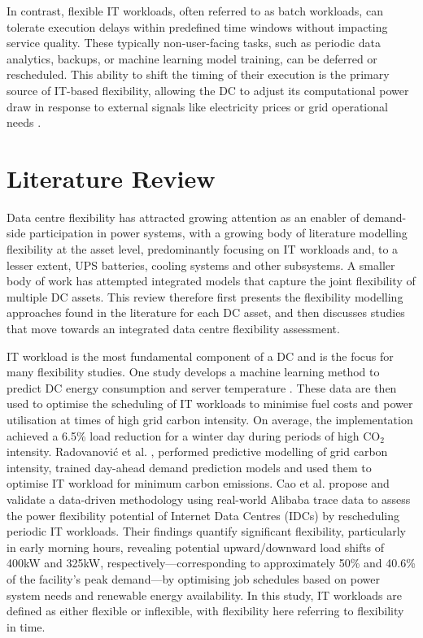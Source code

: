 \documentclass[lettersize,journal]{IEEEtran}
\newcommand{\rev}[1]{\textcolor{blue!70!black}{#1}}
\begin{document}
In contrast, flexible IT workloads, often referred to as batch workloads, can tolerate execution delays within predefined time windows without impacting service quality. These typically non-user-facing tasks, such as periodic data analytics, backups, or machine learning model training, can be deferred or rescheduled. This ability to shift the timing of their execution is the primary source of IT-based flexibility, allowing the DC to adjust its computational power draw in response to external signals like electricity prices or grid operational needs \cite{Cao2022ApEn}.

\section{Literature Review}

\rev{Data centre flexibility has attracted growing attention as an enabler of demand-side participation in power systems, with a growing body of literature modelling flexibility at the asset level, predominantly focusing on IT workloads and, to a lesser extent, UPS batteries, cooling systems and other subsystems. A smaller body of work has attempted integrated models that capture the joint flexibility of multiple DC assets. This review therefore first presents the flexibility modelling approaches found in the literature for each DC asset, and then discusses studies that move towards an integrated data centre flexibility assessment.}

IT workload is the most fundamental component of a DC and is the focus for many flexibility studies. One study develops a machine learning method to predict DC energy consumption and server temperature \cite{misaghian2022assessment}. These data are then used to optimise the scheduling of IT workloads to minimise fuel costs and power utilisation at times of high grid carbon intensity. On average, the implementation achieved a 6.5\% load reduction for a winter day during periods of high CO$_2$ intensity. Radovanović et al. \cite{radovanovic2022carbon}, performed predictive modelling of grid carbon intensity, trained day-ahead demand prediction models and used them to optimise IT workload for minimum carbon emissions.
Cao et al. \cite{cao2022data} propose and validate a data-driven methodology using real-world Alibaba trace data to assess the power flexibility potential of Internet Data Centres (IDCs) by rescheduling periodic IT workloads. Their findings quantify significant flexibility, particularly in early morning hours, revealing potential upward/downward load shifts of 400kW and 325kW, respectively—corresponding to approximately 50\% and 40.6\% of the facility's peak demand—by optimising job schedules based on power system needs and renewable energy availability. In this study, IT workloads are defined as either flexible or inflexible, with flexibility here referring to flexibility in time.
\end{document}
